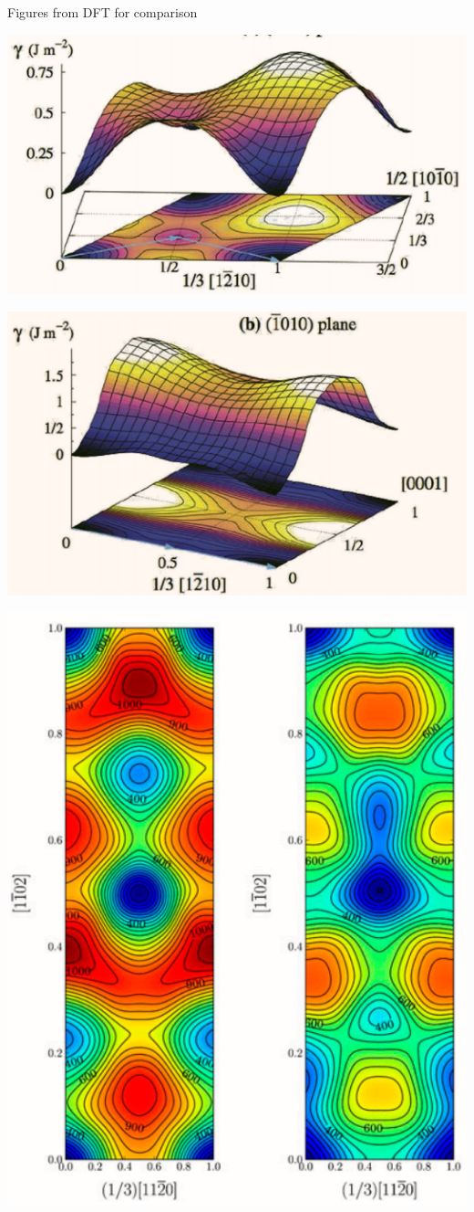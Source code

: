 \documentclass[11pt]{article}
\begin{document}
\begin{enumerate}
Figures from DFT for comparison 
\begin{center}
\includegraphics[width=.9\linewidth]{Images/rodney_basal_ti_gamma_surface.png}
\end{center}
\begin{center}
\includegraphics[width=.9\linewidth]{Images/rodney_prismatic_ti_gamma_surface.png}
\end{center}
\begin{center}
\includegraphics[width=.9\linewidth]{Images/pyramidal_gamma_surface_ready_data_both.png}

\end{center}
\end{enumerate}
\end{document}
